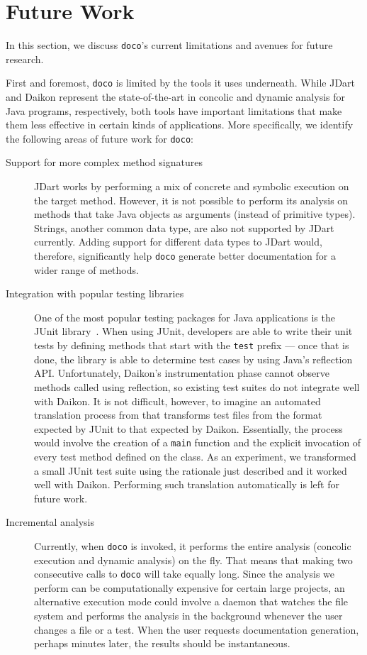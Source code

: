 \section{Future Work}

In this section, we discuss \texttt{doco}'s current limitations and avenues for future research.

First and foremost, \texttt{doco} is limited by the tools it uses underneath. While JDart and Daikon represent the state-of-the-art in concolic and dynamic analysis for Java programs, respectively, both tools have important limitations that make them less effective in certain kinds of applications. More specifically, we identify the following areas of future work for \texttt{doco}:

\begin{description}
    \item [Support for more complex method signatures] JDart works by performing a mix of concrete and symbolic execution on the target method. However, it is not possible to perform its analysis on methods that take Java objects as arguments (instead of primitive types). Strings, another common data type, are also not supported by JDart currently. Adding support for different data types to JDart would, therefore, significantly help \texttt{doco} generate better documentation for a wider range of methods.
    
    \item [Integration with popular testing libraries] One of the most popular testing packages for Java applications is the JUnit library~\cite{junit:2018}. When using JUnit, developers are able to write their unit tests by defining methods that start with the \texttt{test} prefix --- once that is done, the library is able to determine test cases by using Java's reflection API. Unfortunately, Daikon's instrumentation phase cannot observe methods called using reflection, so existing test suites do not integrate well with Daikon. It is not difficult, however, to imagine an automated translation process from that transforms test files from the format expected by JUnit to that expected by Daikon. Essentially, the process would involve the creation of a \texttt{main} function and the explicit invocation of every test method defined on the class. As an experiment, we transformed a small JUnit test suite using the rationale just described and it worked well with Daikon. Performing such translation automatically is left for future work.
    
    \item [Incremental analysis] Currently, when \texttt{doco} is invoked, it performs the entire analysis (concolic execution and dynamic analysis) on the fly. That means that making two consecutive calls to \texttt{doco} will take equally long. Since the analysis we perform can be computationally expensive for certain large projects, an alternative execution mode could involve a daemon that watches the file system and performs the analysis in the background whenever the user changes a file or a test. When the user requests documentation generation, perhaps minutes later, the results should be instantaneous.
\end{description}